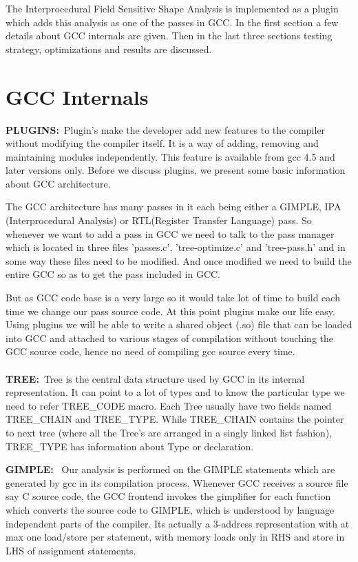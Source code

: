 The Interprocedural Field Sensitive Shape Analysis is implemented as a plugin which adds this analysis as one of the passes in GCC.
In the first section a few details about GCC internals are given. Then in the last three sections testing strategy, optimizations and results 
are discussed.

\section{GCC Internals}

\textbf{PLUGINS:}\ Plugin's make the developer add new features to the compiler without modifying the compiler itself.
It is a way of adding, removing and maintaining modules independently. This feature is available from gcc 4.5 and later versions only.
Before we discuss plugins, we present some basic information about GCC architecture. 

The GCC architecture has many passes in it each being either
a GIMPLE, IPA (Interprocedural Analysis) or RTL(Register Transfer Language) pass. So whenever we want to add a pass in GCC we need to talk to the 
pass manager which is located in three files 'passes.c', 'tree-optimize.c' and 'tree-pass.h' and in some way these files need to be modified. And once 
modified we need to build the entire GCC so as to get the pass included in GCC.

But as GCC code base is a very large so it would take lot of time to build each time we change our pass source code. At this 
point plugins make our life easy.
Using plugins we will be able to write a shared object (.so) file that can be loaded into GCC and attached to various stages of
compilation without touching the GCC source code, hence no need of compiling gcc source every time. \\ \\
\textbf{TREE:}\ Tree is the central data structure used by GCC in its internal representation. It can point to a lot of types and to know the particular
type we need to refer TREE\_CODE macro. Each Tree usually have two fields named TREE\_CHAIN and TREE\_TYPE.
While TREE\_CHAIN contains the pointer to next tree (where all the Tree's are arranged in a singly linked list fashion), TREE\_TYPE has information 
about Type or declaration.

\textbf{GIMPLE:} \ Our analysis is performed on the GIMPLE statements which are generated by gcc in its compilation process.
Whenever GCC receives a source file say C source code, the GCC frontend invokes the gimplifier for each function which converts the source code to 
GIMPLE, which is understood by language independent parts of the compiler.
Its actually a 3-address representation with at max one load/store per statement, with memory loads only in RHS and store in LHS of assignment statements.

